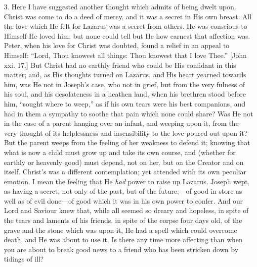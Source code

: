 3. Here I have suggested another thought which admits of being
dwelt upon. Christ was come to do a deed of mercy, and it was a secret
in His own breast. All the love which He felt for Lazarus was a secret
from others. He was conscious to Himself He loved him; but none could
tell but He how earnest that affection was. Peter, when his love for
Christ was doubted, found a relief in an appeal to Himself:
``Lord, Thou knowest all things: Thou knowest that I love
Thee.'' [John xxi. 17.] But Christ had no earthly friend who could
be His confidant in this matter; and, as His thoughts turned on
Lazarus, and His heart yearned towards him, was He not in Joseph's
case, who not in grief, but from the very fulness of his soul, and his
desolateness in a heathen land, when his brethren stood before him,
``sought where to weep,'' as if his own tears were his best
companions, and had in them a sympathy to soothe that pain which none
could share? Was He not in the case of a parent hanging over an
infant, and weeping upon it, from the very thought of its helplessness
and insensibility to the love poured out upon it? But the parent weeps
from the feeling of her weakness to defend it; knowing that what is
now a child must grow up and take its own course, and (whether for
earthly or heavenly good) must depend, not on her, but on the Creator
and on itself. Christ's was a different contemplation; yet attended
with its own peculiar emotion. I mean the feeling that He \emph{had}
power to raise up Lazarus. Joseph wept, as having a secret, not only
of the past, but of the future;—of good in store as well as of evil
done—of good which it was in his own power to confer. And our Lord
and Saviour knew that, while all seemed so dreary and hopeless, in
spite of the tears and laments of his friends, in spite of the corpse
four days old, of the grave and the stone which was upon it, He had a
spell which could overcome death, and He was about to use it. Is there
any time more affecting than when you are about to break good news to
a friend who has been stricken down by tidings of ill?

